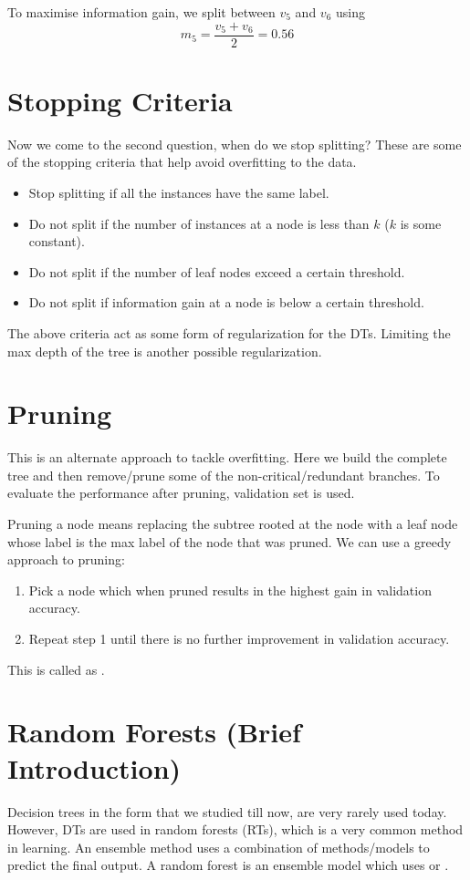 To maximise information gain, we split between $v_5$ and $v_6$ using
$$m_5 = \frac{v_5+v_6}{2} = 0.56$$

\section{Stopping Criteria}
Now we come to the second question, when do we stop splitting?  These are some of the stopping criteria that help avoid overfitting to the data.
\begin{itemize}
  \item Stop splitting if all the instances have the same label.
  \item Do not split if the number of instances at a node is less than $k$ ($k$ is some constant).
  \item Do not split if the number of leaf nodes exceed a certain threshold.
  \item Do not split if information gain at a node is below a certain threshold.
\end{itemize}
The above criteria act as some form of regularization for the DTs. Limiting the max depth of the tree is another possible regularization.

\section{Pruning}
This is an alternate approach to tackle overfitting. Here we build the complete tree and then remove/prune some of the non-critical/redundant branches. To evaluate the performance after pruning, validation set is used.

Pruning a node means replacing the subtree rooted at the node with a leaf node whose label is the max label of the node that was pruned. We can use a greedy approach to pruning:
\begin{enumerate}
  \item Pick a node which when pruned results in the highest gain in validation accuracy.
  \item Repeat step 1 until there is no further improvement in validation accuracy.
\end{enumerate}
This is called as .

\section{Random Forests (Brief Introduction)}

Decision trees in the form that we studied till now, are very rarely used today. However, DTs are used in random forests (RTs), which is a very common method in  learning. An ensemble method uses a combination of methods/models to predict the final output. A random forest is an ensemble model which uses  or . \\

